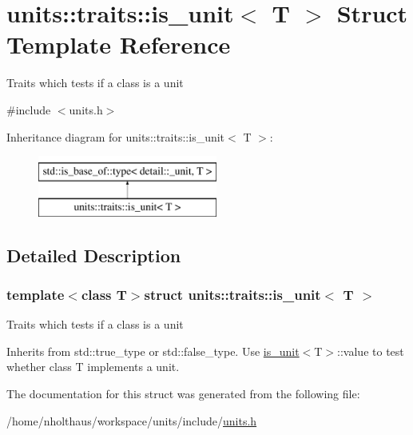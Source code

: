 \hypertarget{structunits_1_1traits_1_1is__unit}{}\section{units\+:\+:traits\+:\+:is\+\_\+unit$<$ T $>$ Struct Template Reference}
\label{structunits_1_1traits_1_1is__unit}


Traits which tests if a class is a {\ttfamily unit}  




{\ttfamily \#include $<$units.\+h$>$}

Inheritance diagram for units\+:\+:traits\+:\+:is\+\_\+unit$<$ T $>$\+:\begin{figure}[H]
\begin{center}
\leavevmode
\includegraphics[height=2.000000cm]{structunits_1_1traits_1_1is__unit}
\end{center}
\end{figure}


\subsection{Detailed Description}
\subsubsection*{template$<$class T$>$struct units\+::traits\+::is\+\_\+unit$<$ T $>$}

Traits which tests if a class is a {\ttfamily unit} 

Inherits from {\ttfamily std\+::true\+\_\+type} or {\ttfamily std\+::false\+\_\+type}. Use {\ttfamily \hyperlink{structunits_1_1traits_1_1is__unit}{is\+\_\+unit}$<$T$>$\+::value} to test whether {\ttfamily class T} implements a {\ttfamily unit}. 

The documentation for this struct was generated from the following file\+:\begin{DoxyCompactItemize}
\item 
/home/nholthaus/workspace/units/include/\hyperlink{units_8h}{units.\+h}\end{DoxyCompactItemize}
